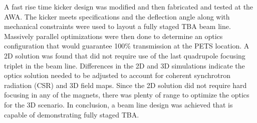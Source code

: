 A fast rise time kicker design was modified and then fabricated and tested at the AWA. 
The kicker meets specifications and the deflection angle 
along with mechanical constraints were used to layout 
a fully staged TBA beam line. 
Massively parallel optimizations were then done to 
determine an optics configuration that would guarantee 
100\% transmission at the PETS location. 
A 2D solution was found that did not require use of the
last quadrupole focusing triplet in the beam  line. 
Differences in the 2D and 3D simulations indicate the optics 
solution needed to be adjusted to account for coherent synchrotron radiation (CSR) and 3D field maps. 
Since the 2D solution did not require hard focusing in any of the magnets, 
there was plenty of range to optimize the optics for the 3D scenario.
In conclusion, a beam line design was achieved that is capable of 
demonstrating fully staged TBA. 










